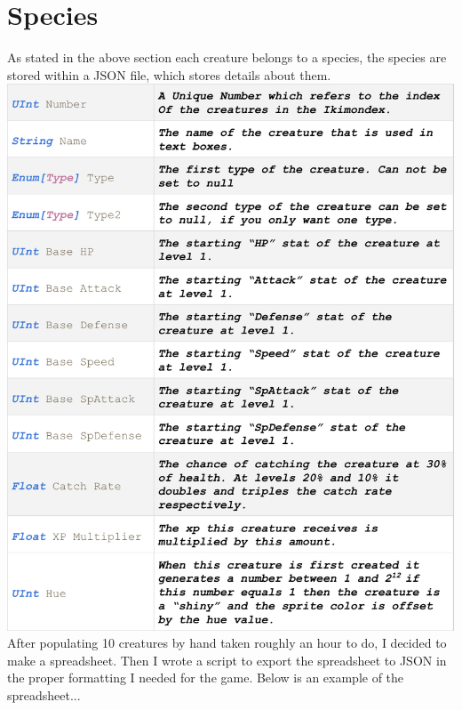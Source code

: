 \documentclass[11pt,a4paper]{article}
\begin{document}
\section{Species}
As stated in the above section each creature belongs to a species, the species are stored within a JSON file, which stores details about them.
\includegraphics[scale=0.76]{Class.pdf}\newpage
After populating 10 creatures by hand taken roughly an hour to do, I decided to make a spreadsheet. Then I wrote a script to export the spreadsheet to JSON in the proper formatting I needed for the game. Below is an example of the spreadsheet...\\
\end{document}
